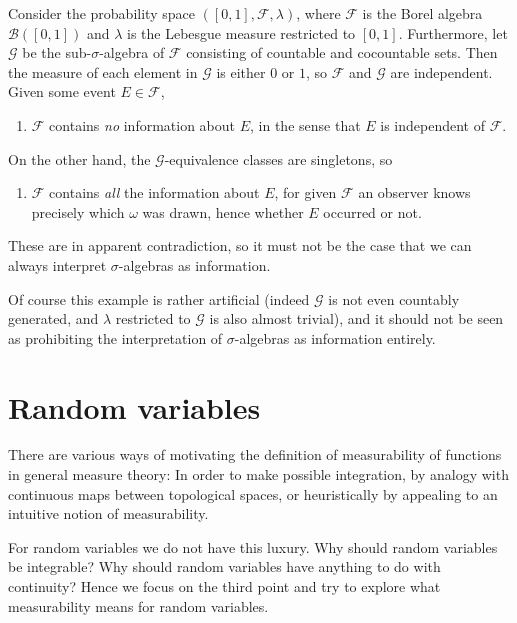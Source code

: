 \documentclass[article, a4paper, 11pt, oneside]{memoir}
\numberwithin{equation}{chapter}
\newcommand{\calB}{\mathcal{B}}
\newcommand{\calF}{\mathcal{F}}
\newcommand{\calG}{\mathcal{G}}
\newcommand{\borel}[1]{\calB(#1)}
\begin{document}
\begin{example}
    Consider the probability space $([0,1], \calF, \lambda)$, where $\calF$ is the Borel algebra $\borel{[0,1]}$ and $\lambda$ is the Lebesgue measure restricted to $[0,1]$. Furthermore, let $\calG$ be the sub-$\sigma$-algebra of $\calF$ consisting of countable and cocountable sets. Then the measure of each element in $\calG$ is either $0$ or $1$, so $\calF$ and $\calG$ are independent. Given some event $E \in \calF$,
    \begin{enumerate}[label=\normalfont(\alph*)]
        \item $\calF$ contains \emph{no} information about $E$, in the sense that $E$ is independent of $\calF$.
    \end{enumerate}
    On the other hand, the $\calG$-equivalence classes are singletons, so
    \begin{enumerate}[resume, label=\normalfont(\alph*)]
        \item $\calF$ contains \emph{all} the information about $E$, for given $\calF$ an observer knows precisely which $\omega$ was drawn, hence whether $E$ occurred or not.
    \end{enumerate}
    These are in apparent contradiction, so it must not be the case that we can always interpret $\sigma$-algebras as information.

    Of course this example is rather artificial (indeed $\calG$ is not even countably generated, and $\lambda$ restricted to $\calG$ is also almost trivial), and it should not be seen as prohibiting the interpretation of $\sigma$-algebras as information entirely.
\end{example}


\section{Random variables}

\newcommand{\meas}[1]{\mathcal{M}(#1)}
\newcommand{\simplemeas}[1]{\mathcal{S\!M}(#1)}

There are various ways of motivating the definition of measurability of functions in general measure theory: In order to make possible integration, by analogy with continuous maps between topological spaces, or heuristically by appealing to an intuitive notion of measurability.

For random variables we do not have this luxury. Why should random variables be integrable? Why should random variables have anything to do with continuity? Hence we focus on the third point and try to explore what measurability means for random variables.
\end{document}
